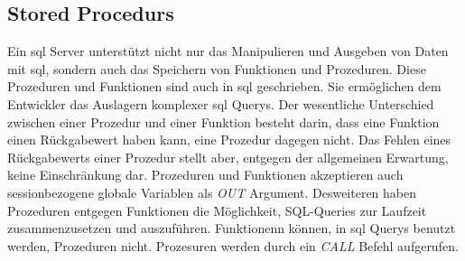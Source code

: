 \subsection{Stored Procedurs}\label{subsec:storedProc}
Ein \ac{sql} Server unterstützt nicht nur das Manipulieren und Ausgeben von Daten mit \ac{sql}, sondern auch das Speichern von Funktionen und Prozeduren.
Diese Prozeduren und Funktionen sind auch in \ac{sql} geschrieben.
Sie ermöglichen dem Entwickler das Auslagern komplexer \ac{sql} Querys.
Der wesentliche Unterschied zwischen einer Prozedur und einer Funktion besteht darin, dass eine Funktion einen Rückgabewert haben kann, eine Prozedur dagegen nicht.
Das Fehlen eines Rückgabewerts einer Prozedur stellt aber, entgegen der allgemeinen Erwartung, keine Einschränkung dar. 
Prozeduren und Funktionen akzeptieren auch sessionbezogene globale Variablen als \emph{OUT} Argument. 
Desweiteren haben Prozeduren entgegen Funktionen die Möglichkeit, SQL-Queries zur Laufzeit zusammenzusetzen und auszuführen.
Funktionenn können, in \ac{sql} Querys benutzt werden, Prozeduren nicht.
Prozesuren werden durch ein \emph{CALL} Befehl aufgerufen.


